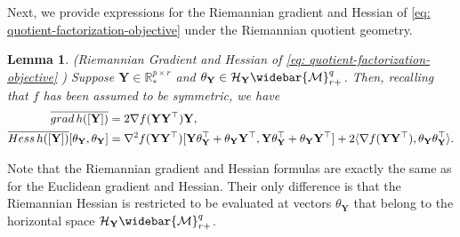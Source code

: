 \documentclass[11pt]{article}
\newtheorem{Lemma}{Lemma}
\newcommand{\bbR}{\mathbb{R}}
\newcommand{\cH}{\mathcal{H}}
\newcommand{\0}{{\mathbf{0}}}
\newcommand{\1}{{\mathbf{1}}}
\newcommand{\Y}{{\mathbf{Y}}}
\newcommand{\cM}{{\cal M}}
\newcommand{\Hess}{{\rm Hess}}
\newcommand{\grad}{{\rm grad}}
\newcommand{\nc}{\normalcolor}
\begin{document}
Next, we provide expressions for the Riemannian gradient and Hessian of \eqref{eq: quotient-factorization-objective} under the Riemannian quotient geometry.
\begin{Lemma}(Riemannian Gradient and Hessian of \eqref{eq: quotient-factorization-objective} \cite[Proposition 1]{luo2021geometric}) \label{lm: gradient-hessian-exp-PSD}
	 Suppose $\Y \in \bbR^{p \times r}_*$ and $\theta_{\Y} \in \cH_{\Y} \widebar{\cM}_{r+}^{q}$. Then, recalling that $f$ has been assumed to be symmetric, we have \nc
		\begin{equation*} %
		\begin{split}
			\overline{\grad\, h([\Y])} &= 2\nabla f(\Y \Y^\top) \Y, \\
			\overline{\Hess \, h([\Y])}[\theta_\Y, \theta_\Y] 
		&= \nabla^2 f(\Y \Y^\top)[\Y\theta_\Y^\top + \theta_\Y \Y^\top , \Y\theta_\Y^\top + \theta_\Y \Y^\top ] + 2\langle \nabla f(\Y \Y^\top ), \theta_\Y \theta_\Y^\top \rangle.
		\end{split}
		\end{equation*}
\end{Lemma}
{Note that the Riemannian gradient and Hessian formulas are exactly the same as for the Euclidean gradient and Hessian. Their only difference is that the Riemannian Hessian is restricted to be evaluated at vectors $\theta_{\Y}$ that belong to the horizontal space $\cH_{\Y} \widebar{\cM}_{r+}^{q}$.}
\end{document}
